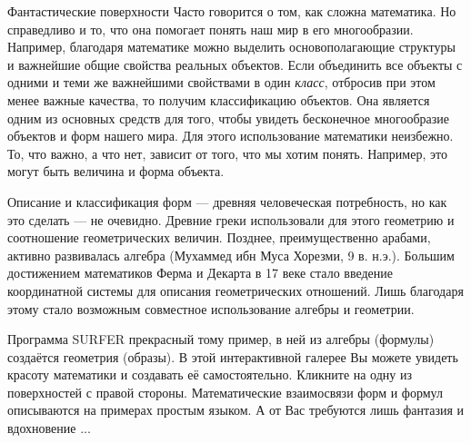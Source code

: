 \begin{surferIntroPage}{Фантастические поверхности}
Часто говорится о том, как сложна математика. Но справедливо и то, что она помогает понять наш мир в его многообразии. Например, благодаря математике можно выделить основополагающие структуры и важнейшие общие свойства реальных объектов. Если объединить все объекты с одними и теми же важнейшими свойствами в один \emph{класс}, отбросив при этом менее важные качества, то получим классификацию объектов. Она является одним из основных средств для того, чтобы увидеть бесконечное многообразие объектов и форм нашего мира. Для этого использование математики неизбежно. То, что важно, а что нет, зависит от того, что мы хотим понять. Например, это могут быть величина и форма объекта.

Описание и классификация форм — древняя человеческая потребность, но как это сделать — не очевидно. Древние греки использовали для этого геометрию и соотношение геометрических величин. Позднее, преимущественно арабами, активно развивалась алгебра (Мухаммед ибн Муса Хорезми, 9 в. н.э.). Большим достижением математиков Ферма и Декарта в 17 веке стало введение координатной системы для описания геометрических отношений. Лишь благодаря этому стало возможным совместное использование алгебры и геометрии. 

Программа SURFER прекрасный тому пример, в ней из алгебры (формулы) создаётся геометрия (образы). В этой интерактивной галерее Вы можете увидеть красоту математики и создавать её самостоятельно. Кликните на одну из поверхностей с правой стороны. Математические взаимосвязи форм и формул описываются на примерах простым языком. А от Вас требуются лишь фантазия и вдохновение ...
\end{surferIntroPage}
